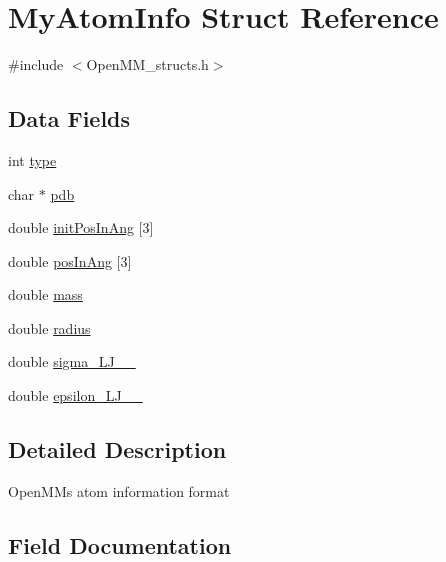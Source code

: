\hypertarget{structMyAtomInfo}{}\section{My\+Atom\+Info Struct Reference}
\label{structMyAtomInfo}


{\ttfamily \#include $<$Open\+M\+M\+\_\+structs.\+h$>$}

\subsection*{Data Fields}
\begin{DoxyCompactItemize}
\item 
int \mbox{\hyperlink{structMyAtomInfo_aed11c9319e0ba5fd5d1d853393e5ca2a}{type}}
\item 
char $\ast$ \mbox{\hyperlink{structMyAtomInfo_a09e8a3f74dab18cb91d1262f8947d8e5}{pdb}}
\item 
double \mbox{\hyperlink{structMyAtomInfo_a8baed26db4167ce38492d90f2b2d313f}{init\+Pos\+In\+Ang}} \mbox{[}3\mbox{]}
\item 
double \mbox{\hyperlink{structMyAtomInfo_a3abe1ccbf133ad5722c6c0166127fced}{pos\+In\+Ang}} \mbox{[}3\mbox{]}
\item 
double \mbox{\hyperlink{structMyAtomInfo_a9c73350529a9d3ca5693743adef8460a}{mass}}
\item 
double \mbox{\hyperlink{structMyAtomInfo_a712bfc36655e20c672039e77c382cb75}{radius}}
\item 
double \mbox{\hyperlink{structMyAtomInfo_a7a7974ff22785c7eb048f2e2f0a73ee8}{sigma\+\_\+\+L\+J\+\_\+\_}}
\item 
double \mbox{\hyperlink{structMyAtomInfo_a0e88ea2540579c4a4e4512dafe07ec3b}{epsilon\+\_\+\+L\+J\+\_\+\_}}
\end{DoxyCompactItemize}


\subsection{Detailed Description}
Open\+MM\textquotesingle{}s atom information format 

\subsection{Field Documentation}
\mbox{\label{structMyAtomInfo_a0e88ea2540579c4a4e4512dafe07ec3b}} 
